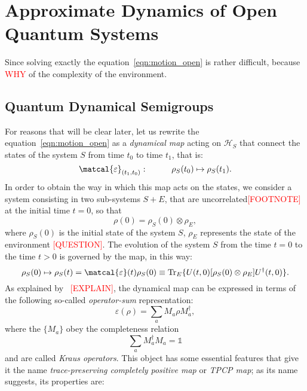 \section{Approximate Dynamics of Open Quantum Systems}
Since solving exactly the equation~\ref{eqn:motion_open} is rather difficult, because \textcolor{red}{WHY} of the complexity of the environment.

\subsection{Quantum Dynamical Semigroups}
For reasons that will be clear later, let us rewrite the equation~\ref{eqn:motion_open} as a \emph{dynamical map} acting on $\mathcal{H}_S$ that connect the states of the system $S$ from time $t_0$ to time $t_1$, that is:
\begin{equation}
    \matcal{\varepsilon}_{(t_1, t_0)}: \hspace{1cm} \rho_S(t_0) \mapsto \rho_S(t_1).
\end{equation}
In order to obtain the way in which this map acts on the states, we consider a system consisting in two sub-systems $S+E$, that are uncorrelated\textcolor{red}{[FOOTNOTE]} at the initial time $t=0$, so that 
\begin{equation}
    \rho(0) = \rho_S(0) \otimes \rho_E,
\end{equation}
where $\rho_S(0)$ is the initial state of the system $S$, $\rho_E$ represents the state of the environment \textcolor{red}{[QUESTION]}. The evolution of the system $S$ from the time $t=0$ to the time $t>0$ is governed by the map, in this way:
\begin{equation}
    \rho_S(0) \mapsto \rho_S(t) = \matcal{\varepsilon}(t)\rho_S(0) \equiv \Tr_E \{U(t, 0)[\rho_S(0) \otimes \rho_E] U^\dagger(t,0)\}.
\end{equation}
As explained by~\cite{presk:quant_info} \textcolor{red}{[EXPLAIN]}, the dynamical map can be expressed in terms of the following so-called \emph{operator-sum} representation:
\begin{equation}
    \varepsilon(\rho) = \sum_a M_a \rho M_a^\dagger,
\end{equation}
where the $\{M_a\}$ obey the completeness relation
\begin{equation}
\label{compl_rel_kraus}
    \sum_a M_a^\dagger M_a = \mathds{1}
\end{equation}
and are called \emph{Kraus operators}. This object has some essential features that give it the name \emph{trace-preserving completely positive map} or \emph{TPCP map}; as its name suggests, its properties are:

